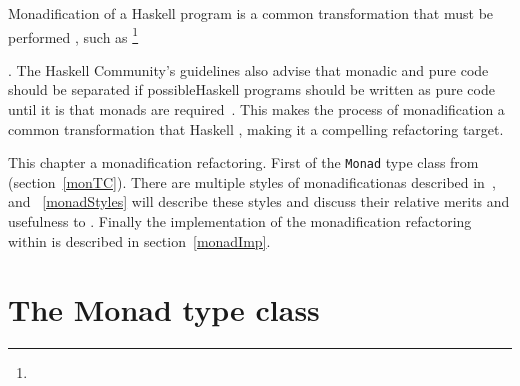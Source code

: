 Monadification of a Haskell program is a common transformation that must be performed \DIFdelbegin {}\DIFdelend \DIFaddbegin {}\DIFaddend , such as \DIFdelbegin {}\footnote{}%
\addtocounter{footnote}{-1}%
\DIFdelend \DIFaddbegin {}\texttt{} \DIFaddend . The Haskell Community's guidelines also advise that monadic and pure code should be separated if possible\DIFdelbegin {}\DIFdelend \DIFaddbegin {}\DIFaddend Haskell programs should be written as pure code until it is \DIFdelbegin {}\DIFdelend \DIFaddbegin {}\DIFaddend that monads are required~\citep{guidelines}. This makes the process of monadification a common transformation that Haskell \DIFdelbegin {}\DIFdelend \DIFaddbegin {}\DIFaddend , making it a compelling refactoring target.

This chapter \DIFdelbegin {}\DIFdelend \DIFaddbegin {}\DIFaddend a monadification refactoring. First \DIFdelbegin {}\DIFdelend \DIFaddbegin {}\DIFaddend of the \texttt{Monad} type class from \DIFdelbegin {}\DIFdelend \DIFaddbegin {}\DIFaddend (section~\ref{monTC}). There are multiple styles of monadification\DIFaddbegin \DIFadd{, }\DIFaddend as described in~\citep{monadSurvey}, and \DIFdelbegin {}\DIFdelend \DIFaddbegin {}\DIFaddend ~\ref{monadStyles} will describe these styles and discuss their relative merits and usefulness to \DIFdelbegin {}\DIFdelend \DIFaddbegin {}\DIFaddend . Finally the implementation of the monadification refactoring within \DIFdelbegin {}\DIFdelend \DIFaddbegin {}\DIFaddend is described in section~\ref{monadImp}.

\DIFdelbegin %
\DIFdelend \DIFaddbegin \section{The Monad type class}
\DIFaddend \label{monTC}

